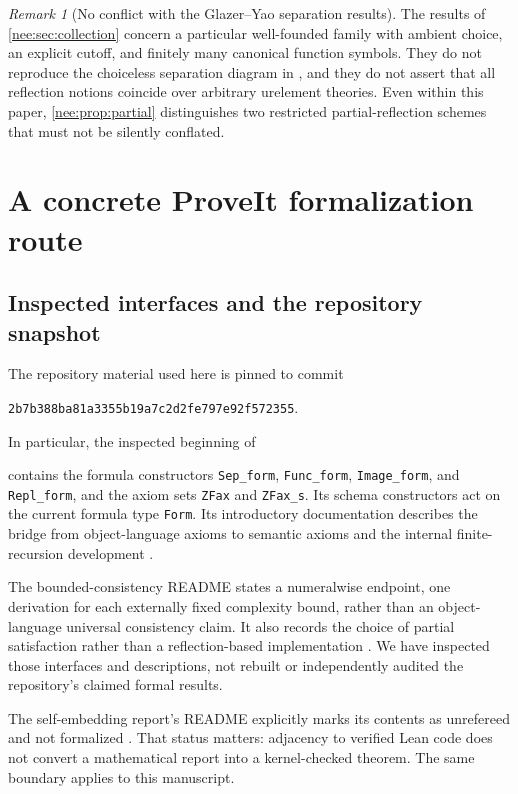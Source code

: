 \documentclass[11pt,letterpaper]{article}
\numberwithin{equation}{section}
\theoremstyle{plain}
\theoremstyle{definition}
\theoremstyle{remark}
\newtheorem{remark}[remark]{Remark}
\newcommand{\repo}[1]{\texttt{\detokenize{#1}}}
\begin{document}
\begin{remark}[No conflict with the Glazer--Yao separation results]
The results of \cref{nee:sec:collection} concern a particular well-founded family with ambient choice, an explicit cutoff, and finitely many canonical function symbols. They do not reproduce the choiceless separation diagram in \cite{GY2026}, and they do not assert that all reflection notions coincide over arbitrary urelement theories. Even within this paper, \cref{nee:prop:partial} distinguishes two restricted partial-reflection schemes that must not be silently conflated.
\end{remark}

\section{A concrete ProveIt formalization route}\label{nee:sec:formalization}

\subsection{Inspected interfaces and the repository snapshot}
The repository material used here is pinned to commit
\begin{center}
\texttt{2b7b388ba81a3355b19a7c2d2fe797e92f572355}.
\end{center}
In particular, the inspected beginning of
\begin{center}
\repo{SetTheory/ZF/Lean/ZF/Zf.lean}
\end{center}
contains the formula constructors \texttt{Sep\_form}, \texttt{Func\_form}, \texttt{Image\_form}, and \texttt{Repl\_form}, and the axiom sets \texttt{ZFax} and \texttt{ZFax\_s}. Its schema constructors act on the current formula type \texttt{Form}. Its introductory documentation describes the bridge from object-language axioms to semantic axioms and the internal finite-recursion development \cite{RepoZF}.

The bounded-consistency README states a numeralwise endpoint, one derivation for each externally fixed complexity bound, rather than an object-language universal consistency claim. It also records the choice of partial satisfaction rather than a reflection-based implementation \cite{RepoBC}. We have inspected those interfaces and descriptions, not rebuilt or independently audited the repository's claimed formal results.

The self-embedding report's README explicitly marks its contents as unrefereed and not formalized \cite{RepoSSE}. That status matters: adjacency to verified Lean code does not convert a mathematical report into a kernel-checked theorem. The same boundary applies to this manuscript.
\end{document}
